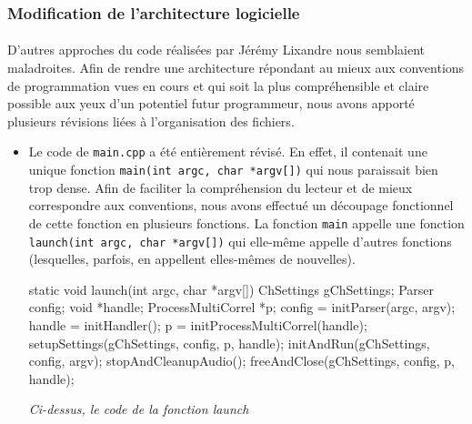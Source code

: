 \subsubsection{Modification de l'architecture logicielle}
\paragraph{}
D'autres approches du code réalisées par Jérémy Lixandre nous
semblaient maladroites. Afin de rendre une architecture répondant au
mieux aux conventions de programmation vues en cours et qui soit la
plus compréhensible et claire possible aux yeux d'un potentiel futur
programmeur, nous avons apporté plusieurs révisions liées à
l'organisation des fichiers.
\begin{itemize}
  \item Le code de \verb!main.cpp! a été entièrement révisé. En effet,
    il contenait une unique fonction
    \verb!main(int argc, char *argv[])! qui nous paraissait bien trop
    dense. Afin de faciliter la compréhension du lecteur et de mieux
    correspondre aux conventions, nous avons effectué un découpage
    fonctionnel de cette fonction en plusieurs fonctions. La fonction
    \verb!main! appelle une fonction
    \verb!launch(int argc, char *argv[])! qui elle-même appelle
    d'autres fonctions (lesquelles, parfois, en appellent elles-mêmes
    de nouvelles).

    \begin{lstlistings}
      static void launch(int argc, char *argv[]){
        ChSettings gChSettings;
        Parser config;
        void *handle;
        ProcessMultiCorrel *p;
        config = initParser(argc, argv);
        handle = initHandler();
        p = initProcessMultiCorrel(handle);
        setupSettings(gChSettings, config, p, handle);
        initAndRun(gChSettings, config, argv);
        stopAndCleanupAudio();
        freeAndClose(gChSettings, config, p, handle);
      }
    \end{lstlistings}

    \begin{center}
      \textit{Ci-dessus, le code de la fonction launch}
    \end{center}    


\end{itemize}
